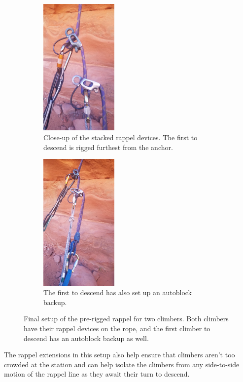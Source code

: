 \documentclass[nonacm,acmtog]{acmart}
\newcommand{\dummyfig}[3]{
  \centering
  \fbox{
    \begin{minipage}[c][#3][c]{#2}
      \centering{#1}
    \end{minipage}
  }
}
\begin{document}
  \begin{figure}
     \centering
     \begin{subfigure}[t]{0.22\textwidth}
        \centering
        \includegraphics[width=1.5in]{images/setup1.jpg}
        \caption{Close-up of the stacked rappel devices.  The first to descend
           is rigged furthest from the anchor.}
        \label{fig:final-setup}
     \end{subfigure}
     \hspace{0.5cm}
     \begin{subfigure}[t]{0.22\textwidth}
        \centering
        \includegraphics[width=1.5in]{images/setup2.jpg}
        \caption{The first to descend has also set up an autoblock backup.}
        \label{fig:final-setup2}
     \end{subfigure}
     \caption{Final setup of the pre-rigged rappel for two climbers.  Both
     climbers have their rappel devices on the rope, and the first climber to
     descend has an autoblock backup as well.}
  \end{figure}

  The rappel extensions in this setup also help ensure that climbers aren't too
  crowded at the station and can help isolate the climbers from any
  side-to-side motion of the rappel line as they await their turn to descend.
\end{document}
